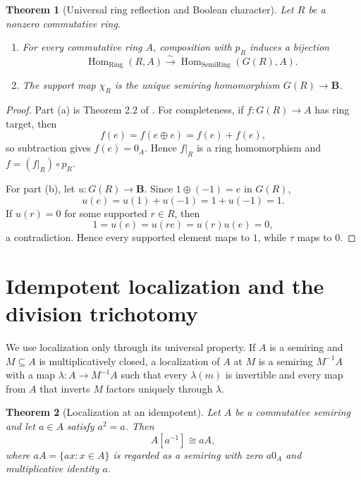 \documentclass[11pt]{amsart}
\numberwithin{equation}{section}
\newtheorem{theorem}{Theorem}[section]
\theoremstyle{definition}
\newcommand{\B}{\mathbf B}
\newcommand{\Hom}{\operatorname{Hom}}
\DeclareMathOperator{\Ring}{Ring}
\DeclareMathOperator{\SemiRing}{SemiRing}
\begin{document}
\begin{theorem}[Universal ring reflection and Boolean character]\label{thm:universal-maps}
Let $R$ be a nonzero commutative ring.
\begin{enumerate}[label=\textup{(\alph*)}]
\item For every commutative ring $A$, composition with $p_R$ induces a bijection
\[
\Hom_{\Ring}(R,A)
\xrightarrow{\sim}
\Hom_{\SemiRing}(G(R),A).
\]
\item The support map $\chi_R$ is the unique semiring homomorphism $G(R)\to\B$.
\end{enumerate}
\end{theorem}

\begin{proof}
Part (a) is Theorem 2.2 of \cite{Secondary}.  For completeness, if $f:G(R)\to A$ has ring target, then
\[
f(e)=f(e\oplus e)=f(e)+f(e),
\]
so subtraction gives $f(e)=0_A$.  Hence $f|_R$ is a ring homomorphism and $f=(f|_R)\circ p_R$.

For part (b), let $u:G(R)\to\B$.  Since $1\oplus(-1)=e$ in $G(R)$,
\[
u(e)=u(1)+u(-1)=1+u(-1)=1.
\]
If $u(r)=0$ for some supported $r\in R$, then
\[
1=u(e)=u(re)=u(r)u(e)=0,
\]
a contradiction.  Hence every supported element maps to $1$, while $\tau$ maps to $0$.
\end{proof}

\section{Idempotent localization and the division trichotomy}

We use localization only through its universal property.  If $A$ is a semiring and $M\subseteq A$ is multiplicatively closed, a localization of $A$ at $M$ is a semiring $M^{-1}A$ with a map $\lambda:A\to M^{-1}A$ such that every $\lambda(m)$ is invertible and every map from $A$ that inverts $M$ factors uniquely through $\lambda$.

\begin{theorem}[Localization at an idempotent]\label{thm:idempotent-localization}
Let $A$ be a commutative semiring and let $a\in A$ satisfy $a^2=a$.  Then
\[
A[a^{-1}]\cong aA,
\]
where $aA=\{ax:x\in A\}$ is regarded as a semiring with zero $a0_A$ and multiplicative identity $a$.
\end{theorem}
\end{document}
